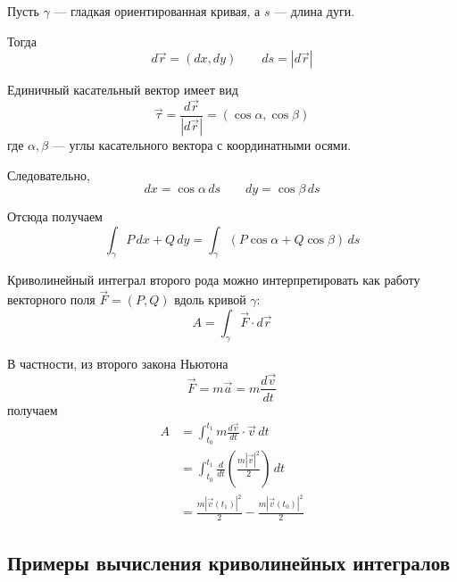 \documentclass[12pt,a4paper]{article}
\begin{document}
Пусть $\gamma$ — гладкая ориентированная кривая, а $s$ — длина дуги.

Тогда
\[
d\vec{r}=(dx,dy)
\qquad
ds=|d\vec{r}|
\]

Единичный касательный вектор имеет вид
\[
\vec{\tau}
=
\frac{d\vec{r}}{|d\vec{r}|}
=
(\cos\alpha,\cos\beta)
\]
где $\alpha,\beta$ — углы касательного вектора с координатными осями.

Следовательно,
\[
dx=\cos\alpha\,ds
\qquad
dy=\cos\beta\,ds
\]

Отсюда получаем
\[
\int_\gamma P\,dx+Q\,dy
=
\int_\gamma
(P\cos\alpha+Q\cos\beta)\,ds
\]

\begin{note}
Криволинейный интеграл второго рода можно интерпретировать как работу векторного поля $\vec{F}=(P,Q)$ вдоль кривой $\gamma$:
\[
A=\int_\gamma\vec{F}\cdot d\vec{r}
\]

В частности, из второго закона Ньютона
\[
\vec{F}=m\vec{a}
=
m\frac{d\vec{v}}{dt}
\]
получаем
\[
\begin{aligned}
A
&=
\int_{t_0}^{t_1}
m\frac{d\vec{v}}{dt}\cdot\vec{v}\,dt
\\
&=
\int_{t_0}^{t_1}
\frac{d}{dt}
\left(\frac{m|\vec{v}|^2}{2}\right)\,dt
\\
&=
\frac{m|\vec{v}(t_1)|^2}{2}
-
\frac{m|\vec{v}(t_0)|^2}{2}
\end{aligned}
\]
\end{note}

\subsection{Примеры вычисления криволинейных интегралов}
\end{document}
